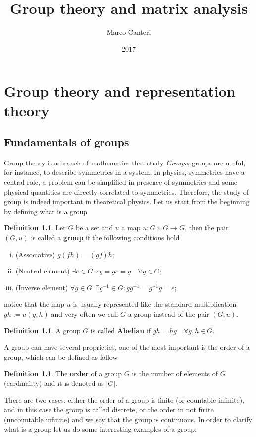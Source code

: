 \documentclass[12pt]{book}
\title{\textbf{Group theory and matrix analysis}}
\author{Marco Canteri}
\date{2017}
\theoremstyle{plain}
\theoremstyle{definition}
\newtheorem{dfn}[thm]{Definition}
\theoremstyle{remark}
\begin{document}
\maketitle
\tableofcontents
\chapter{Group theory and representation theory}
\section{Fundamentals of groups}
Group theory is a branch of mathematics that study \emph{Groups}, groups are useful, for instance, to describe symmetries in a system. In physics, symmetries have a central role, a problem can be simplified in presence of symmetries and some physical quantities are directly correlated to symmetries. Therefore, the study of group is indeed important in theoretical physics.
Let us start from the beginning by defining what is a group
\begin{dfn}
Let $G$ be a set and $u$ a map $u:G\times G\to G$, then the pair $(G,u)$ is called a \textbf{group} if the following conditions hold
\begin{enumerate}[i.]
\item (Associative) $g(fh) = (gf)h$;
\item (Neutral element) $\exists e\in G: eg=ge=g\quad\forall g\in G$;
\item (Inverse element) $\forall g\in G\,$ $\exists g^{-1}\in G: gg^{-1} = g^{-1}g=e$;
\end{enumerate}
notice that the map $u$ is usually represented like the standard multiplication $gh:=u(g,h)$ and very often we call $G$ a group instead of the pair $(G,u)$.
\end{dfn}
\begin{dfn}
A group $G$ is called \textbf{Abelian} if $gh=hg\quad \forall g,h\in G$.
\end{dfn}
A group can have several proprieties, one of the most important is the order of a group, which can be defined as follow
\begin{dfn}
The \textbf{order} of a group $G$ is the number of elements of $G$ (cardinality) and it is denoted as $|G|$. 
\end{dfn}
There are two cases, either the order of a group is finite (or countable infinite), and in this case the group is called discrete, or the order in not finite (uncountable infinite) and we say that the group is continuous. In order to clarify what is a group let us do some interesting examples of a group:
\end{document}
